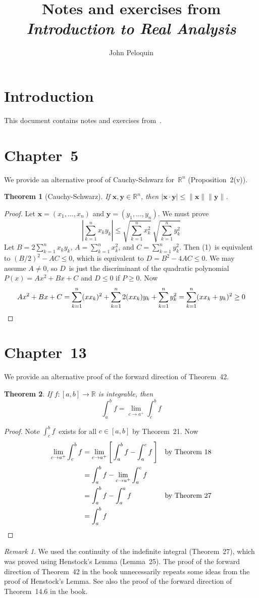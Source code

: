 \documentclass[letterpaper,12pt]{article}
\title{Notes and exercises from\\\textit{Introduction to Real Analysis}}
\author{John Peloquin}
\date{}
\newcommand{\R}{\mathbb{R}}
\newcommand{\abs}[1]{|{#1}|}
\newcommand{\bigabs}[1]{\left|{#1}\right|}
\newcommand{\norm}[1]{\lVert{#1}\rVert}
\renewcommand{\vec}[1]{\boldsymbol{#1}}
\theoremstyle{plain}
\newtheorem*{thm}{Theorem}
\theoremstyle{definition}
\theoremstyle{remark}
\newtheorem*{rmk}{Remark}
\begin{document}
\maketitle

\section*{Introduction}
This document contains notes and exercises from~\cite{depree}.

\section*{Chapter~5}
We provide an alternative proof of Cauchy-Schwarz for~\(\R^n\) (Proposition~2(v)).
\begin{thm}[Cauchy-Schwarz]
If \(\vec{x},\vec{y}\in\R^n\), then \(\abs{\vec{x}\cdot\vec{y}}\le\norm{\vec{x}}\norm{\vec{y}}\).
\end{thm}
\begin{proof}
Let \(\vec{x}=(x_1,\ldots,x_n)\) and \(\vec{y}=(y_1,\ldots,y_n)\). We must prove
\[\bigabs{\sum_{k=1}^n x_ky_k}\le\sqrt{\sum_{k=1}^n x_k^2}\ \sqrt{\sum_{k=1}^n y_k^2}\tag{1}\]
Let \(B=2\sum_{k=1}^n x_ky_k\), \(A=\sum_{k=1}^n x_k^2\), and \(C=\sum_{k=1}^n y_k^2\). Then (1)~is equivalent to \((B/2)^2-AC\le 0\), which is equivalent to \(D=B^2-4AC\le 0\). We may assume \(A\ne 0\), so \(D\)~is just the discriminant of the quadratic polynomial \(P(x)=Ax^2+Bx+C\) and \(D\le 0\) if \(P\ge 0\). Now
\[Ax^2+Bx+C=\sum_{k=1}^n(xx_k)^2+\sum_{k=1}^n2(xx_k)y_k+\sum_{k=1}^ny_k^2=\sum_{k=1}^n(xx_k+y_k)^2\ge 0\qedhere\]
\end{proof}

\section*{Chapter~13}
We provide an alternative proof of the forward direction of Theorem~42.
\begin{thm} If \(f:[a,b]\to\R\) is integrable, then
\[\int_a^b f=\lim_{c\to a^+}\int_c^b f\]
\end{thm}
\begin{proof}
Note \(\int_c^b f\)~exists for all \(c\in[a,b]\) by Theorem~21. Now
\begin{align*}
\lim_{c\to a^+}\int_c^b f&=\lim_{c\to a^+}\left[\,\int_a^b f-\int_a^c f\,\right]&&\text{by Theorem~18}\\
	&=\int_a^b f-\lim_{c\to a^+}\int_a^c f&&\\
	&=\int_a^b f-\int_a^a f&&\text{by Theorem~27}\\
	&=\int_a^b f&&\qedhere
\end{align*}
\end{proof}
\begin{rmk}
We used the continuity of the indefinite integral (Theorem~27), which was proved using Henstock's Lemma (Lemma~25). The proof of the forward direction of Theorem~42 in the book unnecessarily repeats some ideas from the proof of Henstock's Lemma. See also the proof of the forward direction of Theorem~14.6 in the book.
\end{rmk}
\end{document}
